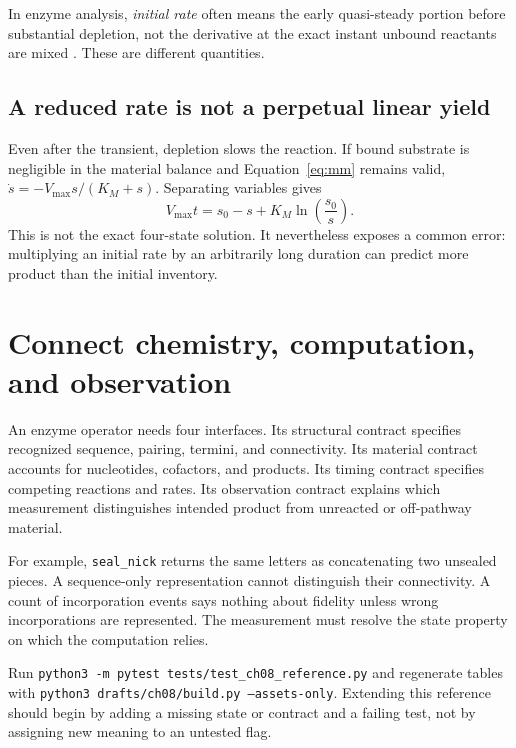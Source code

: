 In enzyme analysis, \emph{initial rate} often means the early quasi-steady portion before substantial depletion, not the derivative at the exact instant unbound reactants are mixed \cite{transient}. These are different quantities.

\subsection{A reduced rate is not a perpetual linear yield}

Even after the transient, depletion slows the reaction. If bound substrate is negligible in the material balance and Equation~\ref{eq:mm} remains valid, $\dot s=-V_{\max}s/(K_M+s)$. Separating variables gives
\begin{equation}
V_{\max}t=s_0-s+K_M\ln\!\left(\frac{s_0}{s}\right).
\label{eq:integrated}
\end{equation}
This is not the exact four-state solution. It nevertheless exposes a common error: multiplying an initial rate by an arbitrarily long duration can predict more product than the initial inventory.

\section{Connect chemistry, computation, and observation}

An enzyme operator needs four interfaces. Its structural contract specifies recognized sequence, pairing, termini, and connectivity. Its material contract accounts for nucleotides, cofactors, and products. Its timing contract specifies competing reactions and rates. Its observation contract explains which measurement distinguishes intended product from unreacted or off-pathway material.

For example, \texttt{seal\_nick} returns the same letters as concatenating two unsealed pieces. A sequence-only representation cannot distinguish their connectivity. A count of incorporation events says nothing about fidelity unless wrong incorporations are represented. The measurement must resolve the state property on which the computation relies.

Run \texttt{python3 -m pytest tests/test\_ch08\_reference.py} and regenerate tables with \texttt{python3 drafts/ch08/build.py --assets-only}. Extending this reference should begin by adding a missing state or contract and a failing test, not by assigning new meaning to an untested flag.

